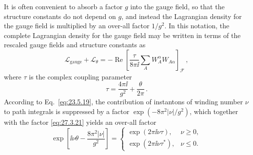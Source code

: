 It is often convenient to absorb a factor \(g\) into the gauge field, so
that the structure constants do not depend on \(g\), and instead the
Lagrangian density for the gauge field is multiplied by an over-all factor
\(1/g^2\). In this notation, the complete Lagrangian density for the gauge
field may be written in terms of the rescaled gauge fields and structure
constants as
\begin{equation}
  \mathcal{L}_{\mathrm{gauge}}+\mathcal{L}_\theta
  =-\operatorname{Re}\left[
    \frac{\tau}{8\pi \ii}
    \sum_AW_A^\alpha W_{A\alpha}
  \right]_{\mathcal{F}}\,,
  \tag{27.3.22}\label{eq:27.3.22}
\end{equation}
where \(\tau\) is the complex coupling parameter
\begin{equation}
  \tau=\frac{4\pi \ii}{g^2}+\frac{\theta}{2\pi}\,.
  \tag{27.3.23}\label{eq:27.3.23}
\end{equation}
According to Eq.~\eqref{eq:23.5.19}, the contribution of instantons of
winding number \(\nu\) to path integrals is suppressed by a factor
\(\exp(-8\pi^2|\nu|/g^2)\), which together with the factor
\eqref{eq:27.3.21} yields an over-all factor
\begin{equation}
  \exp\left[
    \ii\nu\theta-\frac{8\pi^2|\nu|}{g^2}
  \right]
  =
  \begin{cases}
    \exp(2\pi \ii\nu\tau), & \nu\geq 0,\\
    \exp(2\pi \ii\nu\tau^*), & \nu\leq 0.
  \end{cases}
  \tag{27.3.24}\label{eq:27.3.24}
\end{equation}
